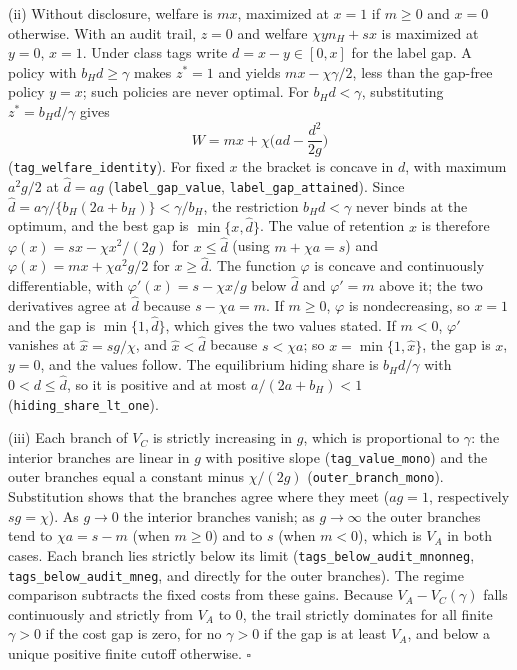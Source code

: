\documentclass[12pt]{article}
\theoremstyle{definition}
\theoremstyle{remark}
\begin{document}
(ii) Without disclosure, welfare is $mx$, maximized at $x=1$ if $m\ge0$ and $x=0$ otherwise. With an audit trail, $z=0$ and welfare $\chi yn_H+sx$ is maximized at $y=0$, $x=1$. Under class tags write $d=x-y\in[0,x]$ for the label gap. A policy with $b_Hd\ge\gamma$ makes $z^*=1$ and yields $mx-\chi\gamma/2$, less than the gap-free policy $y=x$; such policies are never optimal. For $b_Hd<\gamma$, substituting $z^*=b_Hd/\gamma$ gives
\[
W=mx+\chi\Big(ad-\frac{d^2}{2g}\Big)
\]
(\nolinkurl{tag_welfare_identity}). For fixed $x$ the bracket is concave in $d$, with maximum $a^2g/2$ at $\hat d=ag$ (\nolinkurl{label_gap_value}, \nolinkurl{label_gap_attained}). Since $\hat d=a\gamma/\{b_H(2a+b_H)\}<\gamma/b_H$, the restriction $b_Hd<\gamma$ never binds at the optimum, and the best gap is $\min\{x,\hat d\}$. The value of retention $x$ is therefore $\varphi(x)=sx-\chi x^2/(2g)$ for $x\le\hat d$ (using $m+\chi a=s$) and $\varphi(x)=mx+\chi a^2g/2$ for $x\ge\hat d$. The function $\varphi$ is concave and continuously differentiable, with $\varphi'(x)=s-\chi x/g$ below $\hat d$ and $\varphi'=m$ above it; the two derivatives agree at $\hat d$ because $s-\chi a=m$. If $m\ge0$, $\varphi$ is nondecreasing, so $x=1$ and the gap is $\min\{1,\hat d\}$, which gives the two values stated. If $m<0$, $\varphi'$ vanishes at $\hat x=sg/\chi$, and $\hat x<\hat d$ because $s<\chi a$; so $x=\min\{1,\hat x\}$, the gap is $x$, $y=0$, and the values follow. The equilibrium hiding share is $b_Hd/\gamma$ with $0<d\le\hat d$, so it is positive and at most $a/(2a+b_H)<1$ (\nolinkurl{hiding_share_lt_one}).

(iii) Each branch of $V_C$ is strictly increasing in $g$, which is proportional to $\gamma$: the interior branches are linear in $g$ with positive slope (\nolinkurl{tag_value_mono}) and the outer branches equal a constant minus $\chi/(2g)$ (\nolinkurl{outer_branch_mono}). Substitution shows that the branches agree where they meet ($ag=1$, respectively $sg=\chi$). As $g\to0$ the interior branches vanish; as $g\to\infty$ the outer branches tend to $\chi a=s-m$ (when $m\ge0$) and to $s$ (when $m<0$), which is $V_A$ in both cases. Each branch lies strictly below its limit (\nolinkurl{tags_below_audit_mnonneg}, \nolinkurl{tags_below_audit_mneg}, and directly for the outer branches). The regime comparison subtracts the fixed costs from these gains. Because $V_A-V_C(\gamma)$ falls continuously and strictly from $V_A$ to $0$, the trail strictly dominates for all finite $\gamma>0$ if the cost gap is zero, for no $\gamma>0$ if the gap is at least $V_A$, and below a unique positive finite cutoff otherwise. $\square$
\end{document}
